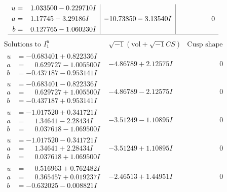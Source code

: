 \documentclass[1p]{elsarticle_modified}
\theoremstyle{definition}
\newcommand{\I}{\sqrt{-1}}
\begin{document}
$$\begin{array}{c|c|c}
\begin{aligned}
u &= \phantom{-}1.033500 - 0.229710 I \\
a &= \phantom{-}1.17745 - 3.29186 I \\
b &= \phantom{-}0.127765 - 1.060230 I\end{aligned}
 & -10.73850 - 3.13540 I & \phantom{-0.000000 } 0\\
 \hline 
 \end{array}$$\newpage$$\begin{array}{c|c|c}  
\text{Solutions to }I^u_{1}& \I (\text{vol} + \sqrt{-1}CS) & \text{Cusp shape}\\
 \hline 
\begin{aligned}
u &= -0.683401 + 0.822336 I \\
a &= \phantom{-}0.629727 - 1.005500 I \\
b &= -0.437187 - 0.953141 I\end{aligned}
 & -4.86789 + 2.12575 I & \phantom{-0.000000 } 0 \\ \hline\begin{aligned}
u &= -0.683401 - 0.822336 I \\
a &= \phantom{-}0.629727 + 1.005500 I \\
b &= -0.437187 + 0.953141 I\end{aligned}
 & -4.86789 - 2.12575 I & \phantom{-0.000000 } 0 \\ \hline\begin{aligned}
u &= -1.017520 + 0.341721 I \\
a &= \phantom{-}1.34641 - 2.28434 I \\
b &= \phantom{-}0.037618 - 1.069500 I\end{aligned}
 & -3.51249 - 1.10895 I & \phantom{-0.000000 } 0 \\ \hline\begin{aligned}
u &= -1.017520 - 0.341721 I \\
a &= \phantom{-}1.34641 + 2.28434 I \\
b &= \phantom{-}0.037618 + 1.069500 I\end{aligned}
 & -3.51249 + 1.10895 I & \phantom{-0.000000 } 0 \\ \hline\begin{aligned}
u &= \phantom{-}0.516963 + 0.762482 I \\
a &= \phantom{-}0.365457 + 0.019237 I \\
b &= -0.632025 - 0.008821 I\end{aligned}
 & -2.46513 + 1.44951 I & \phantom{-0.000000 } 0 \\ \hline\begin{aligned}

\end{aligned}
\end{array}$$
\end{document}
